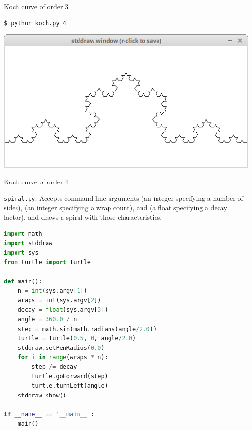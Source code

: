 \documentclass[8pt,a4paper,compress,handout]{beamer}
\begin{document}
\begin{frame}[fragile]
\begin{minipage}{100pt}
\begin{center}
\smallskip

\tiny Koch curve of order 3
\end{center}
\end{minipage}%

\bigskip

\begin{minipage}{200pt}
\begin{lstlisting}[language={}]
$ python koch.py 4
\end{lstlisting}
\end{minipage}%
\hfill
\begin{minipage}{100pt}
\begin{center}
\includegraphics[scale=0.12]{figures/koch5.png}

\smallskip

\tiny Koch curve of order 4
\end{center}
\end{minipage}
\end{frame}

\begin{frame}[fragile]
\begin{framed}
\tiny \lstinline{spiral.py}: Accepts command-line arguments  (an integer specifying a number  of sides),  (an integer specifying a wrap count), and  (a float specifying a decay factor), and draws a spiral with those characteristics.
\end{framed}

\begin{lstlisting}[language=Python]
import math
import stddraw
import sys
from turtle import Turtle

def main():
    n = int(sys.argv[1])
    wraps = int(sys.argv[2])
    decay = float(sys.argv[3])
    angle = 360.0 / n
    step = math.sin(math.radians(angle/2.0))
    turtle = Turtle(0.5, 0, angle/2.0)
    stddraw.setPenRadius(0.0)
    for i in range(wraps * n):
        step /= decay
        turtle.goForward(step)
        turtle.turnLeft(angle)
    stddraw.show()
    
if __name__ == '__main__':
    main()
\end{lstlisting}
\end{frame}
\end{document}
